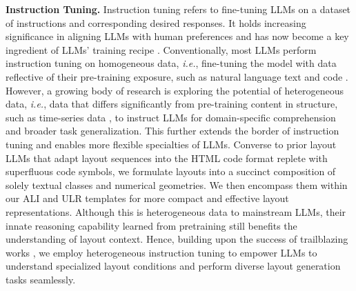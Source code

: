 \textbf{Instruction Tuning.} Instruction tuning refers to fine-tuning LLMs on a dataset of instructions and corresponding desired responses. It holds increasing significance in aligning LLMs with human preferences and has now become a key ingredient of LLMs' training recipe \cite{zhang2023instruction}. Conventionally, most LLMs perform instruction tuning on homogeneous data, \emph{i.e.}, fine-tuning the model with data reflective of their pre-training exposure, such as natural language text \cite{peng2023instruction,1_8ktasks2022chung} and code \cite{codellmam2023roziere,phi12023gunasekar}. However, a growing body of research is exploring the potential of heterogeneous data, \emph{i.e.}, data that differs significantly from pre-training content in structure, such as time-series data \cite{llmtimeseries2023hao,yu2023temporal}, to instruct LLMs for domain-specific comprehension and broader task generalization. This further extends the border of instruction tuning and enables more flexible specialties of LLMs. Converse to prior layout LLMs \cite{layoutprompter2023lin,layoutnuwa2024tang} that adapt layout sequences into the HTML code format replete with superfluous code symbols, we formulate layouts into a succinct composition of solely textual classes and numerical geometries. We then encompass them within our ALI and ULR templates for more compact and effective layout representations. Although this is heterogeneous data to mainstream LLMs, their innate reasoning capability learned from pretraining still benefits the understanding of layout context. Hence, building upon the success of trailblazing works \cite{llmtimeseries2023hao,yu2023temporal}, we employ heterogeneous instruction tuning to empower LLMs to understand specialized layout conditions and perform diverse layout generation tasks seamlessly.
